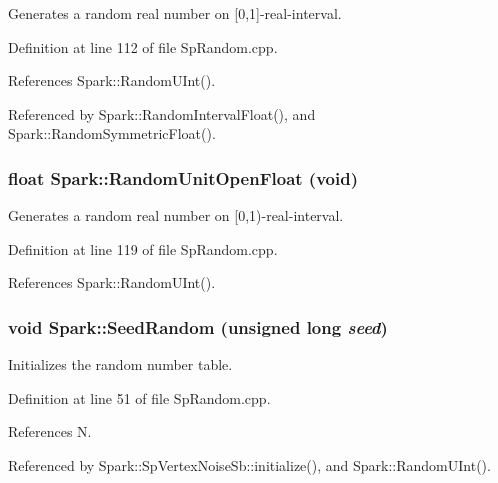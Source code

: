 Generates a random real number on [0,1]-real-interval. 

Definition at line 112 of file Sp\-Random.cpp.

References Spark::Random\-UInt().

Referenced by Spark::Random\-Interval\-Float(), and Spark::Random\-Symmetric\-Float().
\subsubsection{\setlength{\rightskip}{0pt plus 5cm}float Spark::Random\-Unit\-Open\-Float (void)}\label{namespaceSpark_a115}


Generates a random real number on [0,1)-real-interval. 

Definition at line 119 of file Sp\-Random.cpp.

References Spark::Random\-UInt().
\subsubsection{\setlength{\rightskip}{0pt plus 5cm}void Spark::Seed\-Random (unsigned long {\em seed})}\label{namespaceSpark_a112}


Initializes the random number table. 

Definition at line 51 of file Sp\-Random.cpp.

References N.

Referenced by Spark::Sp\-Vertex\-Noise\-Sb::initialize(), and Spark::Random\-UInt().